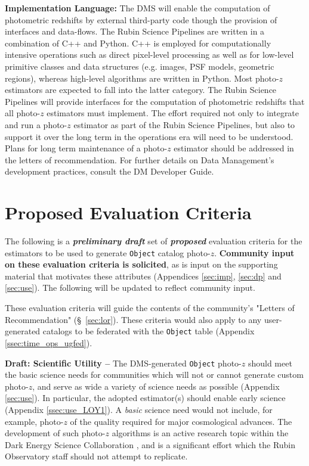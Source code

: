 \documentclass[DM,lsstdraft,toc]{lsstdoc}
\begin{document}
\textbf{Implementation Language:}
The DMS will enable the computation of photometric redshifts by external third-party code though the provision of interfaces and data-flows.  
The Rubin Science Pipelines are written in a combination of C++ and Python. 
C++ is employed for computationally intensive operations such as direct pixel-level processing as well as for low-level primitive classes and data structures (e.g. images, PSF models, geometric regions), whereas high-level algorithms are written in Python. 
Most photo-$z$ estimators are expected to fall into the latter category.
The Rubin Science Pipelines will provide interfaces for the computation of photometric redshifts that all photo-$z$ estimators must implement. 
The effort required not only to integrate and run a photo-$z$ estimator as part of the Rubin Science Pipelines, but also to support it over the long term in the operations era will need to be understood. 
Plans for long term maintenance of a photo-$z$ estimator  should be addressed in the letters of recommendation. 
For further details on Data Management's development practices, consult the DM Developer Guide. \cite{DevGuide} 

\clearpage
\section{Proposed Evaluation Criteria} \label{sec:eval}

The following is a \textbf{\textit{preliminary draft}} set of \textbf{\textit{proposed}} evaluation criteria for the estimators to be used to generate  {\tt Object} catalog photo-$z$.
\textbf{Community input on these evaluation criteria is solicited}, as is input on the supporting material that motivates these attributes (Appendices \ref{sec:imp}, \ref{sec:dp} and \ref{sec:use}).
The following will be updated to reflect community input.

These evaluation criteria will guide the contents of the community's "Letters of Recommendation" (\S~\ref{sec:lor}).
These criteria would also apply to any user-generated catalogs to be federated with the {\tt Object} table (Appendix \ref{ssec:time_ops_ugfed}).

{\bf Draft: Scientific Utility --}
The DMS-generated {\tt Object} photo-$z$ should meet the basic science needs for communities which will not or cannot generate custom photo-$z$, and serve as wide a variety of science needs as possible (Appendix \ref{sec:use}).
In particular, the adopted estimator(s) should enable early science (Appendix \ref{ssec:use_LOY1}).
A {\it basic} science need would not include, for example, photo-$z$ of the quality required for major cosmological advances.
The development of such photo-$z$ algorithms is an active research topic within the Dark Energy Science Collaboration \citep{2018arXiv180901669T}, and is a significant effort which the Rubin Observatory staff should not attempt to replicate. 
\end{document}
